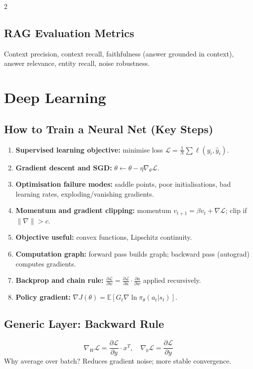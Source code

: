 \documentclass[10pt,a4paper]{article}
\begin{document}
\begin{multicols}{2}
\subsection{RAG Evaluation Metrics}
Context precision, context recall, faithfulness (answer grounded in context), answer relevance, entity recall, noise robustness.

\section{Deep Learning}

\subsection{How to Train a Neural Net (Key Steps)}
\begin{enumerate}
\item \textbf{Supervised learning objective:} minimise loss $\mathcal{L} = \frac{1}{N}\sum \ell(y_i, \hat{y}_i)$.
\item \textbf{Gradient descent and SGD:} $\theta \leftarrow \theta - \eta\nabla_\theta\mathcal{L}$.
\item \textbf{Optimisation failure modes:} saddle points, poor initialisations, bad learning rates, exploding/vanishing gradients.
\item \textbf{Momentum and gradient clipping:} momentum $v_{t+1} = \beta v_t + \nabla\mathcal{L}$; clip if $\|\nabla\| > c$.
\item \textbf{Objective useful:} convex functions, Lipschitz continuity.
\item \textbf{Computation graph:} forward pass builds graph; backward pass (autograd) computes gradients.
\item \textbf{Backprop and chain rule:} $\frac{\partial\mathcal{L}}{\partial w} = \frac{\partial\mathcal{L}}{\partial a}\cdot\frac{\partial a}{\partial w}$ applied recursively.
\item \textbf{Policy gradient:} $\nabla J(\theta) = \mathbb{E}[G_t \nabla\ln\pi_\theta(a_t|s_t)]$.
\end{enumerate}

\subsection{Generic Layer: Backward Rule}
\[
\nabla_W \mathcal{L} = \frac{\partial\mathcal{L}}{\partial y}\cdot x^T, \quad \nabla_b\mathcal{L} = \frac{\partial\mathcal{L}}{\partial y}
\]
Why average over batch? Reduces gradient noise; more stable convergence.


\end{multicols}
\end{document}
